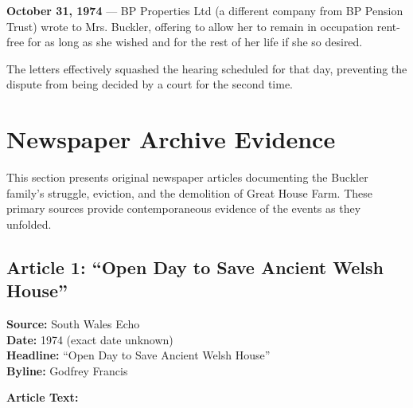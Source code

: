 \documentclass[11pt,a4paper]{article}
\begin{document}
\begin{timeline}
\textbf{October 31, 1974} --- BP Properties Ltd (a different company from BP Pension Trust) wrote to Mrs. Buckler, offering to allow her to remain in occupation rent-free for as long as she wished and for the rest of her life if she so desired.
\end{timeline}

The letters effectively squashed the hearing scheduled for that day, preventing the dispute from being decided by a court for the second time.

\newpage

\section{Newspaper Archive Evidence}

This section presents original newspaper articles documenting the Buckler family's struggle, eviction, and the demolition of Great House Farm. These primary sources provide contemporaneous evidence of the events as they unfolded.

\subsection{Article 1: ``Open Day to Save Ancient Welsh House''}

\begin{newspaperquote}
\textbf{Source:} South Wales Echo\\
\textbf{Date:} 1974 (exact date unknown)\\
\textbf{Headline:} ``Open Day to Save Ancient Welsh House''\\
\textbf{Byline:} Godfrey Francis
\end{newspaperquote}

\textbf{Article Text:}
\end{document}
